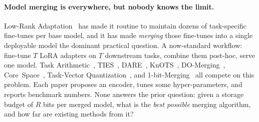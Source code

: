 
\paragraph{Model merging is everywhere, but nobody knows the
limit.} Low-Rank Adaptation~\cite{hu2022lora} has made it routine
to maintain dozens of task-specific fine-tunes per base model,
and it has made \emph{merging} those fine-tunes into a single
deployable model the dominant practical question. A now-standard
workflow: fine-tune $T$ LoRA adapters on $T$ downstream tasks,
combine them post-hoc, serve one model. Task
Arithmetic~\cite{ilharco2023task},
TIES~\cite{yadav2023ties}, DARE~\cite{yu2024dare},
KnOTS~\cite{stoica2025knots},
DO-Merging~\cite{domerging2025},
Core~Space~\cite{panariello2025core},
Task-Vector Quantization~\cite{kim2025tvq},
and 1-bit-Merging~\cite{bit1merging2025} all compete on this
problem. Each paper proposes an encoder, tunes some
hyper-parameters, and reports benchmark numbers. None answers
the prior question: given a storage budget of $R$ bits per
merged model, what is the \emph{best possible} merging
algorithm, and how far are existing methods from it?

